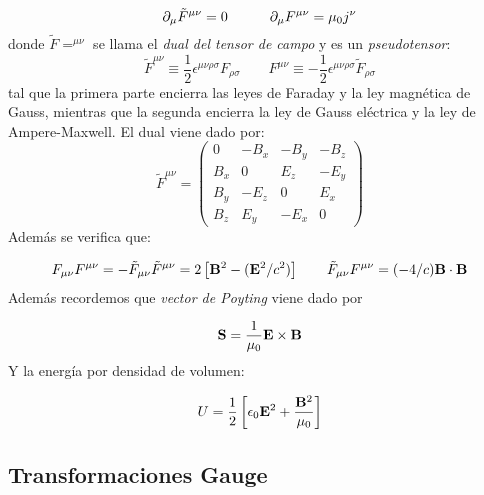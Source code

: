 \begin{equation}
	\partial_\mu \tilde{F}^{\mu \nu} = 0 \quad \quad \quad \partial_\mu F^{\mu \nu} = \mu_0 j^\nu
\end{equation}
donde $\tilde{F}=^{\mu \nu} $ se llama el \textit{dual del tensor de campo} y es un \textit{pseudotensor}:
\begin{equation}
	\tilde{F}^{\mu \nu} \equiv \frac{1}{2} \epsilon^{\mu \nu \rho \sigma} F_{\rho \sigma} \qquad 	{F}^{\mu \nu} \equiv - \frac{1}{2} \epsilon^{\mu \nu \rho \sigma} \tilde{F}_{\rho \sigma}
\end{equation}
tal que la primera parte encierra las leyes de Faraday y la ley magnética de Gauss, mientras que la segunda encierra la ley de Gauss eléctrica y la ley de Ampere-Maxwell. El dual viene dado por:
\begin{equation}
	\tilde{F}^{\mu \nu} = 
	\begin{pmatrix}
		0 & -B_x & -B_y & -B_z \\
		B_x & 0 & E_z & -E_y \\
		B_y & -E_z & 0 & E_x \\
		B_z & E_y & -E_x & 0
	\end{pmatrix}
\end{equation}
Además se verifica que:

\begin{equation}
	F_{\mu \nu} F^{\mu \nu} = - \tilde{F}_{\mu \nu} \tilde{F}^{\mu \nu} = 2 \left[ \mathbf{B}^2 - (\mathbf{E}^2/c^2) \right] \qquad  \tilde{F}_{\mu \nu} {F}^{\mu \nu} = (-4/c) \mathbf{B} \cdot \mathbf{B}
\end{equation}
Además recordemos que \textit{vector de Poyting} viene dado por

\begin{equation}
	\mathbf{S} = \frac{1}{\mu_0} \mathbf{E} \times \mathbf{B}
\end{equation}
Y la energía por densidad de volumen:

\begin{equation}
	U = \frac{1}{2} \left[ \epsilon_0 \mathbf{E}^2 + \frac{\mathbf{B}^2}{\mu_0} \right]
\end{equation}


\subsection{Transformaciones Gauge}